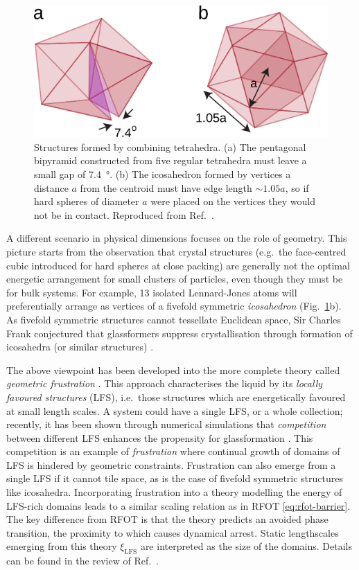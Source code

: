 \documentclass[11pt,twoside]{report}
\begin{document}
\begin{figure}
  \includegraphics[width=0.7\linewidth,outer]{frustration}
  \caption[Frustration of tetrahedral structures]{
    Structures formed by combining tetrahedra.
    (a) The pentagonal bipyramid constructed from five regular tetrahedra must leave a small gap of \SI{7.4}{\degree}.
    (b) The icosahedron formed by vertices a distance $a$ from the centroid must have edge length $\sim1.05 a$, so if hard spheres of diameter $a$ were placed on the vertices they would not be in contact.
    Reproduced from Ref.\ \cite{RoyallPR2015}.
  }
  \label{fig:frustration}
\end{figure}

A different scenario in physical dimensions focuses on the role of geometry.
This picture starts from the observation that crystal structures (e.g.\ the face-centred cubic introduced for hard spheres at close packing) are generally not the optimal energetic arrangement for small clusters of particles, even though they must be for bulk systems.
For example, 13 isolated Lennard-Jones atoms will preferentially arrange as vertices of a fivefold symmetric \emph{icosahedron} \cite{FrankPRS1952} (Fig.\ \ref{fig:frustration}b).
As fivefold symmetric structures cannot tessellate Euclidean space, Sir Charles Frank conjectured that glassformers suppress crystallisation through formation of icosahedra (or similar structures) \cite{FrankPRS1952}.

The above viewpoint has been developed into the more complete theory called \emph{geometric frustration} \cite{KivelsonPA1995,TarjusJPCM2005}.
This approach characterises the liquid by its \emph{locally favoured structures} (LFS), i.e.\ those structures which are energetically favoured at small length scales.
A system could have a single LFS, or a whole collection; recently, it has been shown through numerical simulations that \emph{competition} between different LFS enhances the propensity for glassformation \cite{TeichNC2019}.
This competition is an example of \emph{frustration} where continual growth of domains of LFS is hindered by geometric constraints.
Frustration can also emerge from a single LFS if it cannot tile space, as is the case of fivefold symmetric structures like icosahedra.
Incorporating frustration into a theory modelling the energy of LFS-rich domains leads to a similar scaling relation as in RFOT \eqref{eq:rfot-barrier}.
The key difference from RFOT is that the theory predicts an avoided phase transition, the proximity to which causes dynamical arrest.
Static lengthscales%
emerging from this theory $\xi_\mathrm{LFS}$ are interpreted as the size of the domains.
Details can be found in the review of Ref.\ \cite{TarjusJPCM2005}.
\end{document}
